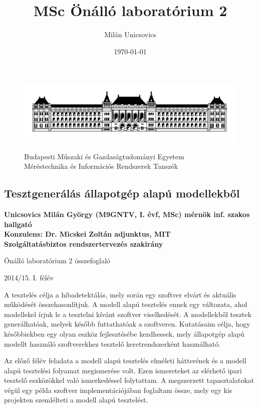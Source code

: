 \documentclass{article}
\author{Milán Unicsovics}
\title{MSc Önálló laboratórium 2}
\date{\today}
\begin{document}
\thispagestyle{empty}
\begin{figure}[htp]
\centering
\includegraphics[scale=0.3]{img/bme.png}
\begin{center}
Budapesti Műszaki és Gazdaságtudományi Egyetem\\
Méréstechnika és Információs Rendszerek Tanszék
\end{center}
\end{figure}
\vspace*{-0.1in}
\begin{center}
\subsection*{Tesztgenerálás állapotgép alapú modellekből}
{\bf
Unicsovics Milán György (M9GNTV, I. évf, MSc) mérnök inf. szakos hallgató\\[0.3cm]

Konzulens: Dr. Micskei Zoltán adjunktus, MIT\\[0.3cm]

Szolgáltatásbiztos rendszertervezés szakirány 

Önálló laboratórium 2 összefoglaló 

2014/15. I. félév
}
\end{center}
\vspace{0.5cm}

A tesztelés célja a hibadetektálás, mely során egy szoftver elvárt és aktuális működését összehasonlítjuk. A modell alapú tesztelés ennek egy változata, ahol modellekel írjuk le a tesztelni kívánt szoftver viselkedését. A modellekből tesztek generálhatóak, melyek később futtathatóak a szoftveren. Kutatásaim célja, hogy későbbiekben egy olyan eszköz fejlesztésébe kezdhessek, mely állapotgép alapú modellt használó szoftverekhez tesztelő keretrendszerként használható.

Az előző félév feladata a modell alapú tesztelés elméleti hátterének és a modell alapú tesztelési folyamat megismerése volt. Ezen ismereteket az elérhető ipari tesztelő eszközökkel való ismerkedéssel folytattam. A megszerzett tapasztalatokat végül egy példa szoftver implementációjában foglaltam össze, mely egy kis projekten szemlélteti a modell alapú tesztelést.
\end{document}
